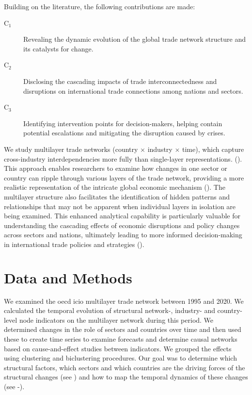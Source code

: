 \documentclass[preprint, 3p,
authoryear]{elsarticle} %
\begin{document}
Building on the literature, the following contributions are made:

\begin{description}
\item[C$_1$\label{c1}] Revealing the dynamic evolution of the global trade network structure and its catalysts for change.
\item[C$_2$\label{c2}] Disclosing the cascading impacts of trade interconnectedness and disruptions on international trade connections among nations and sectors.
\item[C$_3$\label{c3}] Identifying intervention points for decision-makers, helping contain potential escalations and mitigating the disruption caused by crises.
\end{description}

We study multilayer trade networks (country \(\times\) industry
\(\times\) time), which capture cross-industry interdependencies more
fully than single-layer representations. (). This approach
enables researchers to examine how changes in one sector or country can
ripple through various layers of the trade network, providing a more
realistic representation of the intricate global economic mechanism
(). The multilayer structure also facilitates the
identification of hidden patterns and relationships that may not be
apparent when individual layers in isolation are being examined. This
enhanced analytical capability is particularly valuable for
understanding the cascading effects of economic disruptions and policy
changes across sectors and nations, ultimately leading to more informed
decision-making in international trade policies and strategies
().

\section{Data and Methods}\label{data-and-methods}

We examined the \gls{oecd} \gls{icio} multilayer trade network between
1995 and 2020. We calculated the temporal evolution of structural
network-, industry- and country-level node indicators on the multilayer
network during this period. We determined changes in the role of sectors
and countries over time and then used these to create time series to
examine forecasts and determine causal networks based on
cause-and-effect studies between indicators. We grouped the effects
using clustering and biclustering procedures. Our goal was to determine
which structural factors, which sectors and which countries are the
driving forces of the structural changes (see ) and how to
map the temporal dynamics of these changes (see
-).
\end{document}
